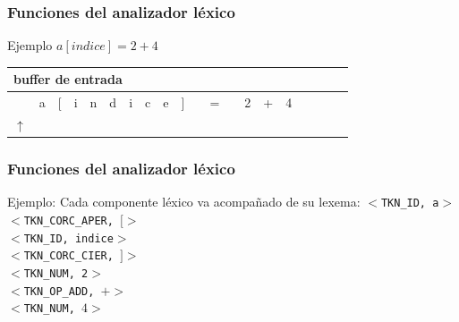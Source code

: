 \documentclass{beamer}
\begin{document}
		\begin{frame}
			\frametitle{Funciones del analizador l\'exico}

			\begin{exampleblock}{Ejemplo}
			    $a[indice] = 2 + 4$ \\
			    \hspace{.5cm}
			    \begin{table}[H]
			        \begin{center}
			            \begin{tabular}{|c|c|c|c|c|c|c|c|c|c|c|c|c|c|c|c|c|c|c|c|} 
			                \multicolumn{20}{l}{buffer de entrada} \\  \hline
			                & a & [ & i & n & d & i & c & e & ] & & = & & 2 & + & 4 & & & & \\ \hline
			                \multicolumn{1}{c}{$\uparrow$} & \multicolumn{19}{l}{} \\  
			            \end{tabular}
			        \end{center}
			    \end{table}
			\end{exampleblock}
		\end{frame}		

		\begin{frame}
			\frametitle{Funciones del analizador l\'exico}

			\begin{exampleblock}{Ejemplo: Cada componente l\'exico va acompa\~nado de su lexema:}
			    \hspace{1cm} \texttt{$<$TKN\_ID, a$>$} \\
			    \hspace{1cm} \texttt{$<$TKN\_CORC\_APER, $[>$} \\
			    \hspace{1cm} \texttt{$<$TKN\_ID, indice$>$} \\
			    \hspace{1cm} \texttt{$<$TKN\_CORC\_CIER, $]>$} \\
			    \hspace{1cm} \texttt{$<$TKN\_NUM, 2$>$} \\
			    \hspace{1cm} \texttt{$<$TKN\_OP\_ADD, $+>$} \\ 
			    \hspace{1cm} \texttt{$<$TKN\_NUM, $4>$}
			\end{exampleblock}
		\end{frame}		
\end{document}
